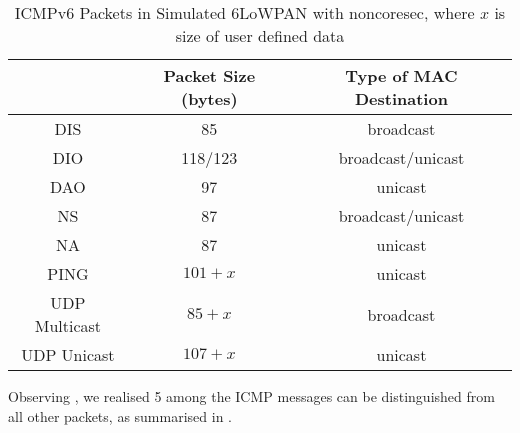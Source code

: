 \begin{table}[ht!]
	\center
	{
		\begin{tabular}{|c|c|c|}
			\hline
			       & Packet Size (bytes) & Type of MAC Destination \\ \hline
			DIS    & 85                  & broadcast                       \\ \hline
			DIO  & 118/123                 & broadcast/unicast                       \\ \hline
			DAO    & 97                  & unicast                      \\ \hline
			NS & 87                  & broadcast/unicast                       \\ \hline
			NA     & 87                  & unicast                      \\ \hline
			PING   & $101+x$               & unicast                      \\ \hline
			UDP Multicast   & $85+x$                  & broadcast               \\ \hline
			UDP Unicast   & $107+x$                  & unicast                       \\ \hline
		\end{tabular}
	}
	\caption{ICMPv6 Packets in Simulated 6LoWPAN with noncoresec, where $x$ is size of user defined data}
	\label{ICMPPacketFeature}
\end{table}

%

Observing , we realised 5 among the ICMP messages can be distinguished from all other packets, as summarised in .

